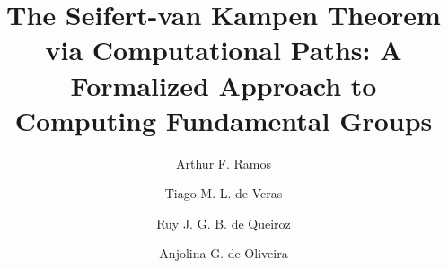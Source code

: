 \documentclass{lmcs}
\theoremstyle{definition}
\theoremstyle{plain}
\theoremstyle{remark}
\begin{document}
\title[The Seifert-van Kampen Theorem via Computational Paths]{The Seifert-van Kampen Theorem via Computational Paths: A Formalized Approach to Computing Fundamental Groups}

\author[A.~F.~Ramos]{Arthur F. Ramos}
\address{Microsoft, USA}

\author[T.~M.~L.~de~Veras]{Tiago M. L. de Veras}
\address{Departamento de Matem\'atica, Universidade Federal Rural de Pernambuco, Brazil}

\author[R.~J.~G.~B.~de~Queiroz]{Ruy J. G. B. de Queiroz}
\address{Centro de Inform\'atica, Universidade Federal de Pernambuco, Brazil}

\author[A.~G.~de~Oliveira]{Anjolina G. de Oliveira}
\address{Centro de Inform\'atica, Universidade Federal de Pernambuco, Brazil}
\end{document}
